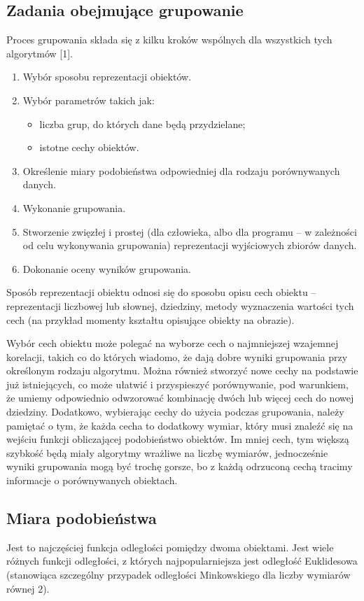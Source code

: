 \documentclass{article}
\begin{document}
\subsection{Zadania obejmujące grupowanie}
Proces grupowania składa się z kilku kroków wspólnych dla wszystkich tych algorytmów [1].
\begin{enumerate}
	\item Wybór sposobu reprezentacji obiektów.
	\item Wybór parametrów takich jak:
	\begin{itemize}
		\item liczba grup, do których dane będą przydzielane;
		\item istotne cechy obiektów.
	\end{itemize}
	\item Określenie miary podobieństwa odpowiedniej dla rodzaju porównywanych danych.
	\item Wykonanie grupowania.
	\item Stworzenie zwięzłej i prostej (dla człowieka, albo dla programu – w zależności od celu wykonywania grupowania) reprezentacji wyjściowych zbiorów danych.
	\item Dokonanie oceny wyników grupowania.
\end{enumerate}

Sposób reprezentacji obiektu odnosi się do sposobu opisu cech obiektu – reprezentacji liczbowej lub słownej, dziedziny, metody wyznaczenia wartości tych cech (na przykład momenty kształtu opisujące obiekty na obrazie).

Wybór cech obiektu może polegać na wyborze cech o najmniejszej wzajemnej korelacji, takich co do których wiadomo, że dają dobre wyniki grupowania przy określonym rodzaju algorytmu. Można również stworzyć nowe cechy na podstawie już istniejących, co może ułatwić i przyspieszyć porównywanie, pod warunkiem, że umiemy odpowiednio odwzorować kombinację dwóch lub więcej cech do nowej dziedziny. Dodatkowo, wybierając cechy do użycia podczas  grupowania, należy pamiętać o tym, że każda cecha to dodatkowy wymiar, który musi znaleźć się na wejściu funkcji obliczającej podobieństwo obiektów. Im mniej cech, tym większą szybkość będą miały algorytmy wrażliwe na liczbę wymiarów, jednocześnie wyniki grupowania mogą być trochę gorsze, bo z każdą odrzuconą cechą tracimy informacje o porównywanych obiektach.


\subsection{Miara podobieństwa}
Jest to najczęściej funkcja odległości pomiędzy dwoma obiektami. Jest wiele różnych funkcji odległości, z których najpopularniejsza jest odległość Euklidesowa (stanowiąca szczególny przypadek odległości Minkowskiego dla liczby wymiarów równej 2).
\end{document}
